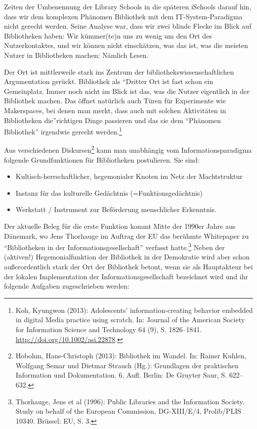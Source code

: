 Zeiten der Umbenennung der Library Schools in die späteren iSchools
darauf hin, dass wir dem komplexen Phänomen Bibliothek mit dem
IT-System-Paradigma nicht gerecht werden. Seine Analyse war, dass wir
zwei blinde Flecke im Blick auf Bibliotheken haben: Wir kümmer(te)n uns
zu wenig um den Ort des Nutzerkontaktes, und wir können nicht
einschätzen, was das ist, was die meisten Nutzer in Bibliotheken machen:
Nämlich Lesen.

Der Ort ist mittlerweile stark ins Zentrum der
bibliothekswissenschaftlichen Argumentation gerückt. Bibliothek als
\enquote{Dritter Ort ist fast schon ein Gemeinplatz. Immer noch nicht im
Blick ist das, was die Nutzer eigentlich in der Bibliothek machen. Das
öffnet natürlich auch Türen für Experimente wie Makerspaces, bei denen
man merkt, dass auch mit solchen Aktivitäten in Bibliotheken
die}richtigen Dinge passieren und das sie dem \enquote{Phänomen Bibliothek}
irgendwie gerecht werden.\footnote{Koh, Kyungwon (2013): Adolescents'
  information-creating behavior embedded in digital Media practice using
  scratch. In: Journal of the American Society for Information Science
  and Technology 64 (9), S. 1826--1841.
  \url{http://doi.org/10.1002/asi.22878}.}

Aus verschiedenen Diskursen\footnote{Hobohm, Hans-Christoph (2013):
  Bibliothek im Wandel. In: Rainer Kuhlen, Wolfgang Semar und Dietmar
  Strauch (Hg.): Grundlagen der praktischen Information und
  Dokumentation. 6. Aufl. Berlin: De Gruyter Saur, S. 622--632.} kann
man unabhängig vom Informationsparadigma folgende Grundfunktionen für
Bibliotheken postulieren. Sie sind:

\begin{itemize}
\item
  Kultisch-herrschaftlicher, hegemonialer Knoten im Netz der
  Machtstruktur
\item
  Instanz für das kulturelle Gedächtnis (=Funktionsgedächtnis)
\item
  Werkstatt / Instrument zur Beförderung menschlicher Erkenntnis.
\end{itemize}

Der aktuelle Beleg für die erste Funktion kommt Mitte der 1990er Jahre
aus Dänemark, wo Jens Thorhauge im Auftrag der EU das berühmte
Whitepaper zu \enquote{Bibliotheken in der Informationsgesellschaft}
verfasst hatte.\footnote{Thorhauge, Jens et al (1996): Public Libraries
  and the Information Society. Study on behalf of the European
  Commission, DG-XIII/E/4, Prolib/PLIS 10340. Brüssel: EU, S. 3.} Neben
der (aktiven!) Hegemonialfunktion der Bibliothek in der Demokratie wird
aber schon außerordentlich stark der Ort der Bibliothek betont, wenn sie
als Hauptakteur bei der lokalen Implementation der
Informationsgesellschaft bezeichnet wird und ihr folgende Aufgaben
zugeschrieben werden:

